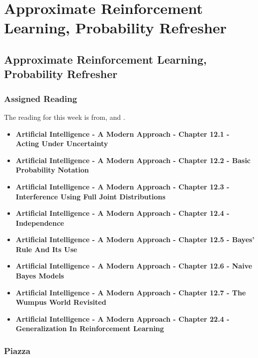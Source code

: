 \clearpage

\renewcommand{\ChapTitle}{Approximate Reinforcement Learning, Probability Refresher}
\renewcommand{\SectionTitle}{Approximate Reinforcement Learning, Probability Refresher}

\chapter{\ChapTitle}

\section{\SectionTitle}

\subsection{Assigned Reading}

The reading for this week is from, \AITextbook \hspace*{1pt} and \RLTextbook.

\begin{itemize}
    \item \textbf{Artificial Intelligence - A Modern Approach - Chapter 12.1 - Acting Under Uncertainty}
    \item \textbf{Artificial Intelligence - A Modern Approach - Chapter 12.2 - Basic Probability Notation}
    \item \textbf{Artificial Intelligence - A Modern Approach - Chapter 12.3 - Interference Using Full Joint Distributions}
    \item \textbf{Artificial Intelligence - A Modern Approach - Chapter 12.4 - Independence}
    \item \textbf{Artificial Intelligence - A Modern Approach - Chapter 12.5 - Bayes' Rule And Its Use}
    \item \textbf{Artificial Intelligence - A Modern Approach - Chapter 12.6 - Naive Bayes Models}
    \item \textbf{Artificial Intelligence - A Modern Approach - Chapter 12.7 - The Wumpus World Revisited}
    \item \textbf{Artificial Intelligence - A Modern Approach - Chapter 22.4 - Generalization In Reinforcement Learning}
\end{itemize}

\subsection{Piazza}

